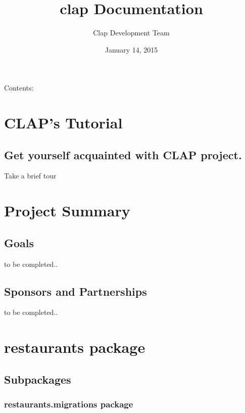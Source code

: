 \documentclass[letterpaper,10pt,english]{sphinxmanual}
\title{clap Documentation}
\date{January 14, 2015}
\author{Clap Development Team}
\begin{document}
\maketitle
\tableofcontents
{}\label{index::doc}


Contents:


\chapter{CLAP's Tutorial}
\label{tutorial::doc}\label{tutorial:clap-s-tutorial}\label{tutorial:welcome-to-clap-s-documentation}

\section{Get yourself acquainted with CLAP project.}
\label{tutorial:get-yourself-acquainted-with-clap-project}
Take a brief tour


\chapter{Project Summary}
\label{project::doc}\label{project:project-summary}

\section{Goals}
\label{project:goals}
to be completed..


\section{Sponsors and Partnerships}
\label{project:sponsors-and-partnerships}
to be completed..


\chapter{restaurants package}
\label{restaurants:restaurants-package}\label{restaurants::doc}

\section{Subpackages}
\label{restaurants:subpackages}

\subsection{restaurants.migrations package}
\label{restaurants.migrations::doc}\label{restaurants.migrations:restaurants-migrations-package}
\end{document}
